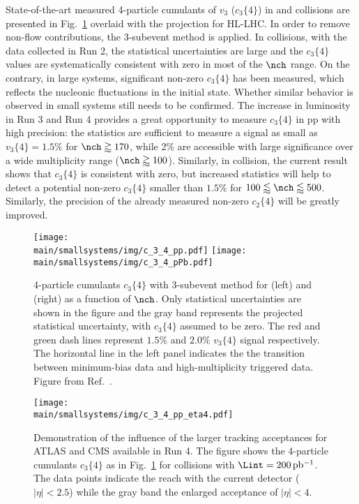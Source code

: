 \documentclass[../report.tex]{subfiles}
\providecommand{\main}{..}
\begin{document}
State-of-the-art measured 4-particle cumulants of $v_3$ ($c_3\{4\}$) in \pp and \pPb collisions are presented in Fig.~\ref{fig:smallsystems_corr_cumulants} overlaid with the projection for HL-LHC. 
In order to remove non-flow contributions, the 3-subevent method is applied. In \pp collisions, with the data collected in Run 2, the statistical uncertainties are large and the $c_3\{4\}$ values are systematically consistent with zero in most of the $\nch$ range. On the contrary, in large systems, significant non-zero $c_3\{4\}$ has been measured, which reflects the nucleonic fluctuations in the initial state. Whether similar behavior is observed in small systems still needs to be confirmed. The increase in luminosity in Run 3 and Run 4 provides a great opportunity to measure $c_3\{4\}$ in pp with high precision: the statistics are sufficient to measure a signal as small as $v_3\{4\} = 1.5\%$ for $\nch \gtrapprox 170$, while 2\% are accessible with large significance over a wide multiplicity range ($\nch \gtrapprox 100$). Similarly, in \pPb collision, the current result shows that $c_3\{4\}$ is consistent with zero, but increased statistics will help to detect a potential non-zero $c_3\{4\}$ smaller than $1.5\%$ for $100 \lessapprox \nch \lessapprox 500$. Similarly, the precision of the already measured non-zero $c_2\{4\}$ will be greatly improved.

\begin{figure}[ht]
\centering
\texttt{[image: \\main/smallsystems/img/c\_3\_4\_pp.pdf]}
\hfill
\texttt{[image: \\main/smallsystems/img/c\_3\_4\_pPb.pdf]}
\caption{4-particle cumulants $c_3\{4\}$ with 3-subevent method for \pp (left) and \pPb (right) as a function of $\nch$. Only statistical uncertainties are shown in the figure and the gray band represents the projected statistical uncertainty, with $c_3\{4\}$ assumed to be zero. The red and green dash lines represent $1.5\%$ and $2.0\%$ $v_3\{4\}$ signal respectively. The horizontal line in the left panel indicates the the transition between minimum-bias data and high-multiplicity triggered data. Figure from Ref.~\cite{}.}
\label{fig:smallsystems_corr_cumulants}
\end{figure}

\begin{figure}[ht]
\centering
\texttt{[image: \\main/smallsystems/img/c\_3\_4\_pp\_eta4.pdf]}
\caption{Demonstration of the influence of the larger tracking acceptances for ATLAS and CMS available in Run 4. The figure shows the 4-particle cumulants $c_3\{4\}$ as in Fig.~\ref{fig:smallsystems_corr_cumulants} for \pp collisions with $\Lint = \unit[200]{pb^{-1}}$. The data points indicate the reach with the current detector ($|\eta| < 2.5$) while the gray band the enlarged acceptance of $|\eta| < 4$.}
\label{fig:smallsystems_corr_cumulants_eta4}
\end{figure}
\end{document}
